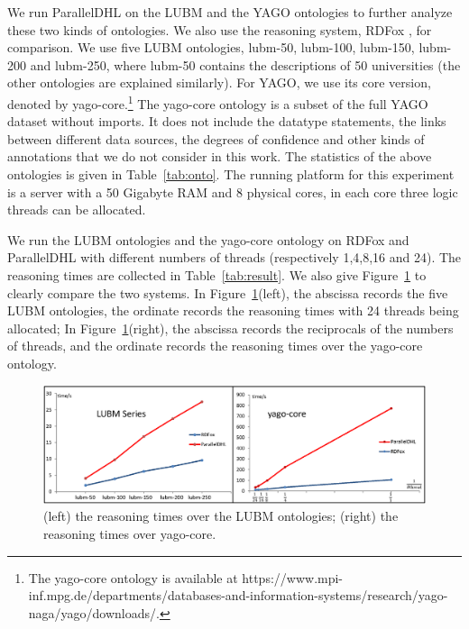 We run ParallelDHL on the LUBM and the YAGO ontologies to further analyze these
two kinds of ontologies. We also use the reasoning system, RDFox \cite{MotikNPHO14},
for comparison. We use five LUBM ontologies, lubm-50, lubm-100, lubm-150, lubm-200
and lubm-250, where lubm-50 contains the descriptions of 50 universities (the other ontologies
are explained similarly). For YAGO, we use its core version, denoted by yago-core.\footnote{
The yago-core ontology is available at https://www.mpi-inf.mpg.de/departments/databases-and-information-systems/research/yago-naga/yago/downloads/.}
The yago-core ontology is a subset of the full YAGO dataset without imports. It does not include the datatype statements, the links
between different data sources, the degrees of confidence and other kinds of
annotations that we do not consider in this work. The statistics of the above ontologies is given in Table~\ref{tab:onto}.
The running platform for this experiment is a server with a 50 Gigabyte RAM and 8 physical cores, in each core
three logic threads can be allocated.

We run the LUBM ontologies and the yago-core ontology on RDFox and ParallelDHL with different numbers of
threads (respectively 1,4,8,16 and 24).
The reasoning times are collected in Table~\ref{tab:result}. We also give Figure~\ref{fig:reasoningtime} to
clearly compare the two systems.
In Figure~\ref{fig:reasoningtime}(left), the abscissa records the five LUBM ontologies,
the ordinate records the reasoning times with 24 threads being allocated;
In Figure~\ref{fig:reasoningtime}(right), the abscissa records the reciprocals of the numbers of threads, and
the ordinate records the reasoning times over the yago-core ontology.


\begin{figure}[htbp]
\begin{center}
\includegraphics[width=1\textwidth]{fig-reasoningtime.eps}
\caption{(left) the reasoning times over the LUBM ontologies; (right) the reasoning times over yago-core.}
\label{fig:reasoningtime}
\end{center}
\end{figure}


